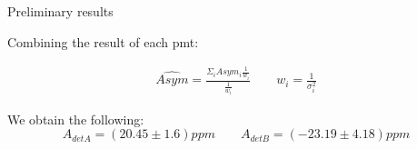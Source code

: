 \documentclass[8pt,a4paper]{beamer}
\begin{document}
\begin{frame}{Preliminary results}
 
Combining the result of each pmt:

\begin{gather*}
\hat{Asym} =  \frac{\Sigma_{i} Asym_{i} \frac{1}{w_{i}}}{\frac{1}{w_{i}}} \qquad w_{i} = \frac{1}{\sigma^{2}_{i}}
\end{gather*}

We obtain the following:
\begin{equation}
A_{detA} = (20.45 \pm 1.6) ppm  \qquad A_{detB} = (-23.19  \pm 4.18)ppm
\end{equation}

\end{frame}
\end{document}
